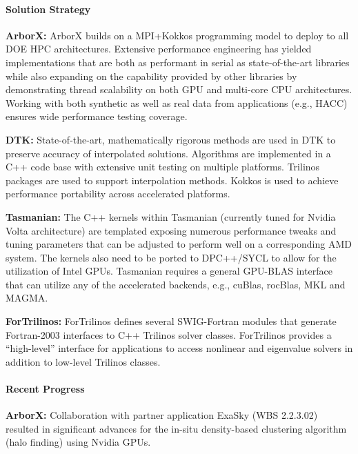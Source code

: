 \paragraph{Solution Strategy}

\nobreak


\indent

{\bf ArborX:} ArborX builds on a MPI+Kokkos programming model to deploy to all
DOE HPC architectures. Extensive performance engineering has yielded
implementations that are both as performant in serial as state-of-the-art
libraries while also expanding on the capability provided by other libraries by
demonstrating thread scalability on both GPU and multi-core CPU architectures.
Working with both synthetic as well as real data from applications (e.g., HACC)
ensures wide performance testing coverage.

{\bf DTK:} State-of-the-art, mathematically rigorous methods are used in DTK
to preserve accuracy of interpolated solutions.  Algorithms are implemented in
a C++ code base with extensive unit testing on multiple platforms.  Trilinos
packages are used to support interpolation methods.  Kokkos is used to achieve
performance portability across accelerated platforms.

{\bf Tasmanian:} The C++ kernels within Tasmanian (currently tuned for Nvidia
Volta architecture) are templated exposing numerous performance tweaks and
tuning parameters that can be adjusted to perform well on a corresponding AMD
system.
The kernels also need to be ported to DPC++/SYCL to allow for the utilization
of Intel GPUs. Tasmanian requires a general GPU-BLAS interface that can
utilize any of the accelerated backends, e.g., cuBlas, rocBlas, MKL and MAGMA.

{\bf ForTrilinos:}
ForTrilinos defines several SWIG-Fortran modules that generate Fortran-2003
interfaces to C++ Trilinos solver classes. ForTrilinos provides a
``high-level'' interface for applications to access nonlinear and eigenvalue
solvers in addition to low-level Trilinos classes.


\paragraph{Recent Progress}

\indent

{\bf ArborX:} Collaboration with partner application ExaSky (WBS 2.2.3.02)
resulted in significant advances for the in-situ density-based clustering
algorithm (halo finding) using Nvidia GPUs.

